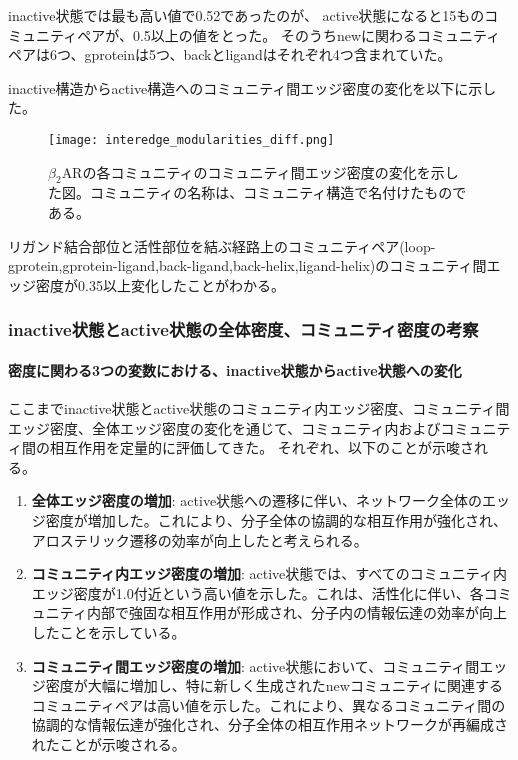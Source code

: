 inactive状態では最も高い値で0.52であったのが、
active状態になると15ものコミュニティペアが、0.5以上の値をとった。
そのうちnewに関わるコミュニティペアは6つ、gproteinは5つ、backとligandはそれぞれ4つ含まれていた。

inactive構造からactive構造へのコミュニティ間エッジ密度の変化を以下に示した。

\begin{figure}[htbp]
  \centering
  \texttt{[image: interedge\_modularities\_diff.png]}
  \caption{$\beta_2$ARの各コミュニティのコミュニティ間エッジ密度の変化を示した図。コミュニティの名称は、コミュニティ構造で名付けたものである。}
  \label{fig:inter_diff}
\end{figure}

\newpage

リガンド結合部位と活性部位を結ぶ経路上のコミュニティペア(loop-gprotein,gprotein-ligand,back-ligand,back-helix,ligand-helix)のコミュニティ間エッジ密度が0.35以上変化したことがわかる。

\subsubsection{inactive状態とactive状態の全体密度、コミュニティ密度の考察}


\paragraph{密度に関わる3つの変数における、inactive状態からactive状態への変化}

ここまでinactive状態とactive状態のコミュニティ内エッジ密度、コミュニティ間エッジ密度、全体エッジ密度の変化を通じて、コミュニティ内およびコミュニティ間の相互作用を定量的に評価してきた。
それぞれ、以下のことが示唆される。
\begin{enumerate}
  \item \textbf{全体エッジ密度の増加}: active状態への遷移に伴い、ネットワーク全体のエッジ密度が増加した。これにより、分子全体の協調的な相互作用が強化され、アロステリック遷移の効率が向上したと考えられる。
  \item \textbf{コミュニティ内エッジ密度の増加}: active状態では、すべてのコミュニティ内エッジ密度が1.0付近という高い値を示した。これは、活性化に伴い、各コミュニティ内部で強固な相互作用が形成され、分子内の情報伝達の効率が向上したことを示している。
  \item \textbf{コミュニティ間エッジ密度の増加}: active状態において、コミュニティ間エッジ密度が大幅に増加し、特に新しく生成されたnewコミュニティに関連するコミュニティペアは高い値を示した。これにより、異なるコミュニティ間の協調的な情報伝達が強化され、分子全体の相互作用ネットワークが再編成されたことが示唆される。
\end{enumerate}

